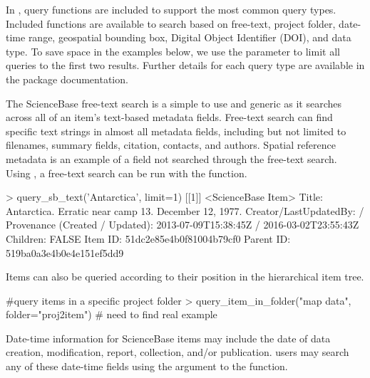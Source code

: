 In , query functions are included to support the most common query types. 
Included functions are available to search based on free-text, project folder, 
date-time range, geospatial
bounding box, Digital Object Identifier (DOI), and data type. To save space in
the examples below, we use the  parameter to limit all queries to
the first two results. Further details for each query type are available in the
package documentation.


The ScienceBase free-text search is a simple to use and generic as it 
searches across all of an item's text-based metadata fields. Free-text 
search can find specific text strings in almost all metadata fields, including 
but not limited to filenames, summary fields, citation, contacts, and authors. 
Spatial reference metadata is an example of a field not searched through the 
free-text search. Using , a free-text 
search can be run with the  function.

\begin{example}
> query_sb_text('Antarctica', limit=1)
[[1]]
<ScienceBase Item> 
  Title: Antarctica. Erratic near camp 13. December 12, 1977.
  Creator/LastUpdatedBy:      / 
  Provenance (Created / Updated):  2013-07-09T15:38:45Z / 2016-03-02T23:55:43Z
  Children: FALSE
  Item ID: 51dc2e85e4b0f81004b79cf0
  Parent ID: 519ba0a3e4b0e4e151ef5dd9
\end{example}

Items can also be queried according to their position in the hierarchical item
tree.

\begin{example}
#query items in a specific project folder
> query_item_in_folder("map data", folder="proj2item")
# need to find real example
\end{example}

Date-time information for ScienceBase items may include the date of
data creation, modification, report, collection, and/or
publication.  users may search any of these
date-time fields using the  argument to the
 function.

